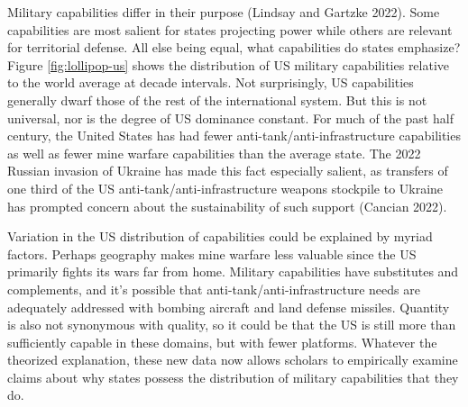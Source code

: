 \documentclass[
]{article}
\begin{document}
Military capabilities differ in their purpose (Lindsay and Gartzke 2022). Some capabilities are most salient for states projecting power while others are relevant for territorial defense. All else being equal, what capabilities do states emphasize? Figure \ref{fig:lollipop-us} shows the distribution of US military capabilities relative to the world average at decade intervals. Not surprisingly, US capabilities generally dwarf those of the rest of the international system. But this is not universal, nor is the degree of US dominance constant. For much of the past half century, the United States has had fewer anti-tank/anti-infrastructure capabilities as well as fewer mine warfare capabilities than the average state. The 2022 Russian invasion of Ukraine has made this fact especially salient, as transfers of one third of the US anti-tank/anti-infrastructure weapons stockpile to Ukraine has prompted concern about the sustainability of such support (Cancian 2022).

Variation in the US distribution of capabilities could be explained by myriad factors. Perhaps geography makes mine warfare less valuable since the US primarily fights its wars far from home. Military capabilities have substitutes and complements, and it's possible that anti-tank/anti-infrastructure needs are adequately addressed with bombing aircraft and land defense missiles. Quantity is also not synonymous with quality, so it could be that the US is still more than sufficiently capable in these domains, but with fewer platforms. Whatever the theorized explanation, these new data now allows scholars to empirically examine claims about why states possess the distribution of military capabilities that they do.
\end{document}
